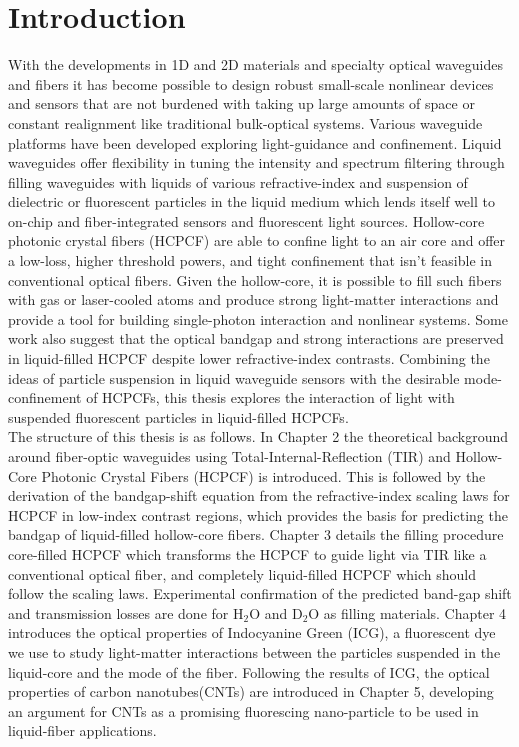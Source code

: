 \chapter{Introduction}
With the developments in 1D and 2D materials and specialty optical waveguides and fibers it has become possible to design robust small-scale nonlinear devices and sensors\cite{cusano,yamashita.tutorial} that are not burdened with taking up large amounts of space or constant realignment like traditional bulk-optical systems. Various waveguide platforms have been developed exploring light-guidance and confinement. Liquid waveguides offer flexibility in tuning the intensity and spectrum filtering through filling waveguides with liquids of various refractive-index and suspension of dielectric or fluorescent particles in the liquid medium\cite{conroy, bliss, vezenov} which lends itself well to on-chip and fiber-integrated sensors and fluorescent light sources. Hollow-core photonic crystal fibers (HCPCF) are able to confine light to an air core and offer a low-loss, higher threshold powers, and tight confinement that isn't feasible in conventional optical fibers. Given the hollow-core, it is possible to fill such fibers with gas or laser-cooled atoms and produce strong light-matter interactions\cite{bajcsy, hilton} and provide a tool for building single-photon interaction and nonlinear systems. Some work also suggest that the optical bandgap and strong interactions are preserved in liquid-filled HCPCF \cite{antonopoulos} despite lower refractive-index contrasts. Combining the ideas of particle suspension in liquid waveguide sensors with the desirable mode-confinement of HCPCFs, this thesis explores the interaction of light with suspended fluorescent particles in liquid-filled HCPCFs.\\  
The structure of this thesis is as follows. In Chapter 2 the theoretical background around fiber-optic waveguides using Total-Internal-Reflection (TIR) and Hollow-Core Photonic Crystal Fibers (HCPCF) is introduced. This is followed by the derivation of  the bandgap-shift equation from the refractive-index scaling laws  for HCPCF in low-index contrast regions, which provides the basis for predicting the bandgap of liquid-filled hollow-core fibers. Chapter 3 details the filling procedure core-filled HCPCF which transforms the HCPCF to guide light via TIR like a conventional optical fiber, and completely liquid-filled HCPCF which should follow the scaling laws. Experimental confirmation of the predicted band-gap shift and transmission losses are done for H${}_2$O and D${}_2$O as filling materials. Chapter 4 introduces the optical properties of Indocyanine Green (ICG), a fluorescent dye we use to study light-matter interactions between the particles suspended in the liquid-core and the mode of the fiber. Following the results of ICG, the optical properties of carbon nanotubes(CNTs) are introduced in Chapter 5, developing an argument for CNTs as a promising fluorescing nano-particle to be used in liquid-fiber applications. 